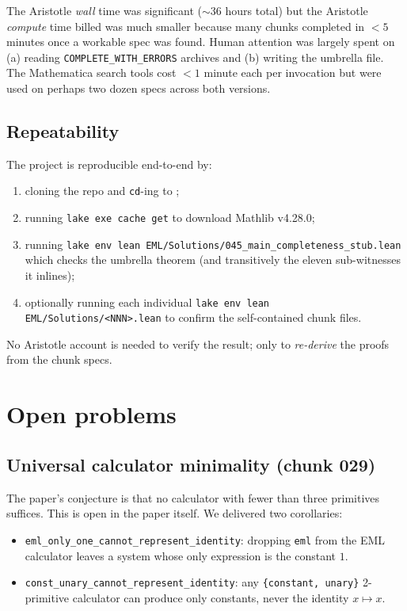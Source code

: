 \documentclass[11pt,a4paper]{article}
\theoremstyle{plain}
\theoremstyle{definition}
\begin{document}
The Aristotle \emph{wall} time was significant ($\sim$36 hours total)
but the Aristotle \emph{compute} time billed was much smaller because
many chunks completed in $< 5$ minutes once a workable spec was found.
Human attention was largely spent on (a) reading
\texttt{COMPLETE\_WITH\_ERRORS} archives and (b) writing the umbrella
file.  The Mathematica search tools cost $< 1$ minute each per
invocation but were used on perhaps two dozen specs across both
versions.

\subsection{Repeatability}

The project is reproducible end-to-end by:

\begin{enumerate}[leftmargin=*,nosep]
\item cloning the repo and \texttt{cd}-ing to
;
\item running \texttt{lake exe cache get} to download Mathlib v4.28.0;
\item running \texttt{lake env lean EML/Solutions/045\_main\_completeness\_stub.lean}
which checks the umbrella theorem (and transitively the eleven
sub-witnesses it inlines);
\item optionally running each individual
\texttt{lake env lean EML/Solutions/<NNN>.lean} to confirm the
self-contained chunk files.
\end{enumerate}

No Aristotle account is needed to verify the result; only to
\emph{re-derive} the proofs from the chunk specs.

\section{Open problems}\label{sec:open}

\subsection{Universal calculator minimality (chunk 029)}

The paper's conjecture is that no calculator with fewer than three
primitives suffices.  This is open in the paper itself.  We delivered
two corollaries:

\begin{itemize}[leftmargin=*,nosep]
\item \texttt{eml\_only\_one\_cannot\_represent\_identity}: dropping
\texttt{eml} from the EML calculator leaves a system whose only
expression is the constant $1$.
\item \texttt{const\_unary\_cannot\_represent\_identity}: any
\texttt{\{constant, unary\}} 2-primitive calculator can produce only
constants, never the identity $x\mapsto x$.
\end{itemize}
\end{document}
